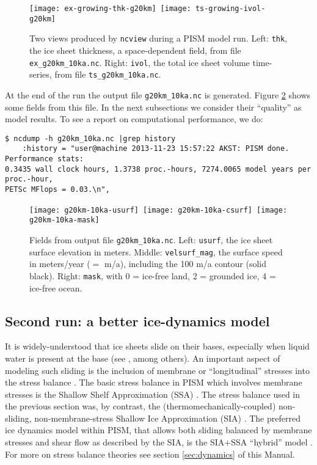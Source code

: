 \begin{figure}[ht]
\centering
\mbox{\texttt{[image: ex-growing-thk-g20km]}
  \qquad \texttt{[image: ts-growing-ivol-g20km]}}
\caption{Two views produced by \texttt{ncview} during a PISM model run.  Left: \texttt{thk}, the ice sheet thickness, a space-dependent field, from file \texttt{ex_g20km_10ka.nc}.  Right: \texttt{ivol}, the total ice sheet volume time-series, from file \texttt{ts_g20km_10ka.nc}.}
\label{fig:growing}
\end{figure}

At the end of the run the output file \texttt{g20km_10ka.nc} is generated.  Figure \ref{fig:firstoutput} shows some fields from this file.  In the next subsections we consider their ``quality'' as model results.  To see a report on computational performance, we do:
\begin{verbatim}
$ ncdump -h g20km_10ka.nc |grep history
    :history = "user@machine 2013-11-23 15:57:22 AKST: PISM done.  Performance stats:
0.3435 wall clock hours, 1.3738 proc.-hours, 7274.0065 model years per proc.-hour,
PETSc MFlops = 0.03.\n",
\end{verbatim}

\begin{figure}[ht]
\centering
\mbox{\texttt{[image: g20km-10ka-usurf]} \texttt{[image: g20km-10ka-csurf]} \texttt{[image: g20km-10ka-mask]}}
\caption{Fields from output file \texttt{g20km_10ka.nc}.  Left: \texttt{usurf}, the ice sheet surface elevation in meters.  Middle: \texttt{velsurf_mag}, the surface speed in meters/year ($=$ m/a), including the 100 m/a contour (solid black).  Right: \texttt{mask}, with 0 = ice-free land, 2 = grounded ice, 4 = ice-free ocean.}
\label{fig:firstoutput}
\end{figure}


\subsection{Second run: a better ice-dynamics model}  \label{subsect:ssarun}

It is widely-understood that ice sheets slide on their bases, especially when liquid water is present at the base (see \cite{Joughinetal2001,MacAyeal}, among others).  An important aspect of modeling such sliding is the inclusion of membrane or ``longitudinal'' stresses into the stress balance \cite{BBssasliding}.  The basic stress balance in PISM which involves membrane stresses is the Shallow Shelf Approximation (SSA) \cite{WeisGreveHutter}.  The stress balance used in the previous section was, by contrast, the (thermomechanically-coupled) non-sliding, non-membrane-stress Shallow Ice Approximation (SIA) \cite{BBL,EISMINT00}.  The preferred ice dynamics model within PISM, that allows both sliding balanced by membrane stresses and shear flow as described by the SIA, is the SIA+SSA ``hybrid'' model \cite{BBssasliding,Winkelmannetal2011}.  For more on stress balance theories see section \ref{sec:dynamics} of this Manual.

